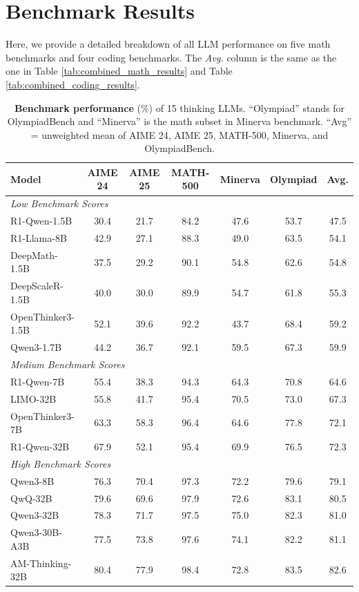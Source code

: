\documentclass{article} %
\begin{document}
\section{Benchmark Results}
Here, we provide a detailed breakdown of all LLM performance on five math benchmarks and four coding benchmarks. The \textit{Avg.} column is the same as the one in Table \ref{tab:combined_math_results} and Table \ref{tab:combined_coding_results}. 
\begin{table}[ht!]
  \centering
  \begin{tabular}{l*{6}{c}}
    \toprule
    \textbf{Model} &
    \textbf{AIME 24} &
    \textbf{AIME 25} &
    \textbf{MATH-500} &
    \textbf{Minerva} &
    \textbf{Olympiad} &
    \textbf{Avg.} \\
    \midrule
    \multicolumn{7}{l}{\textit{Low Benchmark Scores}} \\
    \midrule
    R1-Qwen-1.5B          & 30.4 & 21.7 & 84.2 & 47.6 & 53.7 & 47.5 \\
    R1-Llama-8B           & 42.9 & 27.1 & 88.3 & 49.0 & 63.5 & 54.1 \\
    DeepMath-1.5B                 & 37.5 & 29.2 & 90.1 & 54.8 & 62.6 & 54.8 \\
    DeepScaleR-1.5B               & 40.0 & 30.0 & 89.9 & 54.7 & 61.8 & 55.3 \\
    OpenThinker3-1.5B             & 52.1 & 39.6 & 92.2 & 43.7 & 68.4 & 59.2 \\
    Qwen3-1.7B                    & 44.2 & 36.7 & 92.1 & 59.5 & 67.3 & 59.9 \\
    \midrule
    \multicolumn{7}{l}{\textit{Medium Benchmark Scores}} \\
    \midrule
    R1-Qwen-7B            & 55.4 & 38.3 & 94.3 & 64.3 & 70.8 & 64.6 \\
    LIMO-32B                      & 55.8 & 41.7 & 95.4 & 70.5 & 73.0 & 67.3 \\
    OpenThinker3-7B               & 63.3 & 58.3 & 96.4 & 64.6 & 77.8 & 72.1 \\
    R1-Qwen-32B           & 67.9 & 52.1 & 95.4 & 69.9 & 76.5 & 72.3 \\
    \midrule
    \multicolumn{7}{l}{\textit{High Benchmark Scores}} \\
    \midrule
    Qwen3-8B                      & 76.3 & 70.4 & 97.3 & 72.2 & 79.6 & 79.1 \\
    QwQ-32B                       & 79.6 & 69.6 & 97.9 & 72.6 & 83.1 & 80.5 \\
    Qwen3-32B                     & 78.3 & 71.7 & 97.5 & 75.0 & 82.3 & 81.0 \\
    Qwen3-30B-A3B                 & 77.5 & 73.8 & 97.6 & 74.1 & 82.2 & 81.1 \\
    AM-Thinking-32B            & 80.4 & 77.9 & 98.4 & 72.8 & 83.5 & 82.6 \\
    \bottomrule
  \end{tabular}
  \caption{\textbf{Benchmark performance} (\%) of 15 thinking LLMs. ``Olympiad'' stands for OlympiadBench and ``Minerva'' is the math subset in Minerva benchmark. ``Avg'' = unweighted mean  of AIME 24, AIME 25, MATH-500, Minerva, and OlympiadBench.}
  \label{tab:full_benchmark_scores}
\end{table}
\end{document}
